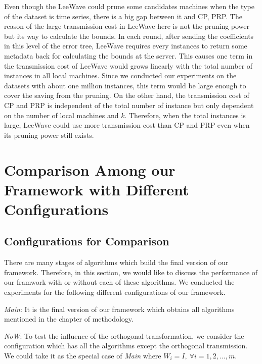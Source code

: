 Even though the LeeWave could prune some candidates machines when the type of the dataset is time series, there is a big gap between it and CP, PRP.  The reason of the large transmission cost in LeeWave here is not the pruning power but its way to calculate the bounds.  In each round, after sending the coefficients in this level of the error tree, LeeWave requires every instances to return some metadata back for calculating the bounds at the server.  This causes one term in the transmission cost of LeeWave would grows linearly with the total number of instances in all local machines.  Since we conducted our experiments on the datasets with about one million instances, this term would be large enough to cover the saving from the pruning.  On the other hand, the transmission cost of CP and PRP is independent of the total number of instance but only dependent on the number of local machines and $k$.  Therefore, when the total instances is large, LeeWave could use more transmission cost than CP and PRP even when its pruning power still exists.





\section{Comparison Among our Framework with Different Configurations} %
\label{s:comparison_among_our_framework_with_different_configurations}


\subsection{Configurations for Comparison} %
\label{sub:configurations_for_comparison}

There are many stages of algorithms which build the final version of our framework.  Therefore, in this section, we would like to discuss the performance of our framwork with or without each of these algorithms.  We conducted the experiments for the following different configurations of our framework.

\emph{Main}: It is the final version of our framework which obtains all algorithms mentioned in the chapter of methodology.

\emph{NoW}: To test the influence of the orthogonal transformation, we consider the configuration which has all the algorithms except the orthogonal transmission.  We could take it as the special case of \emph{Main} where $W_i=I,~\forall i=1,2,\ldots,m$.


